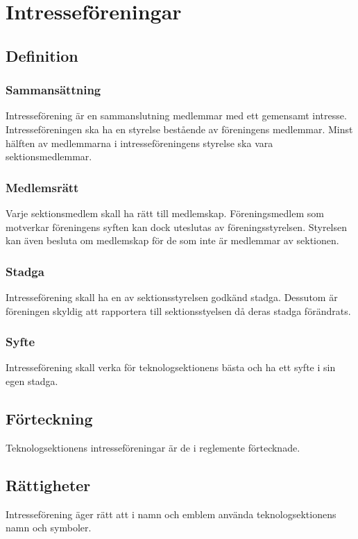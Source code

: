 \section{Intresseföreningar}

\subsection{Definition}

\subsubsection{Sammansättning}
Intresseförening är en sammanslutning medlemmar med ett gemensamt intresse. Intresseföreningen ska ha en styrelse bestående av föreningens medlemmar. Minst hälften av medlemmarna i intresseföreningens styrelse ska vara sektionsmedlemmar.

\subsubsection{Medlemsrätt}
Varje sektionsmedlem skall ha rätt till medlemskap. Föreningsmedlem som motverkar föreningens syften kan dock uteslutas av föreningsstyrelsen.
Styrelsen kan även besluta om medlemskap för de som inte är medlemmar av sektionen.

\subsubsection{Stadga}
Intresseförening skall ha en av sektionsstyrelsen godkänd stadga. Dessutom är föreningen skyldig att rapportera till sektionsstyelsen då deras stadga förändrats.

\subsubsection{Syfte}
Intresseförening skall verka för teknologsektionens bästa och ha ett syfte i sin egen stadga.

\subsection{Förteckning}
Teknologsektionens intresseföreningar är de i reglemente förtecknade.

\subsection{Rättigheter}
Intresseförening äger rätt att i namn och emblem använda teknologsektionens namn och symboler.

